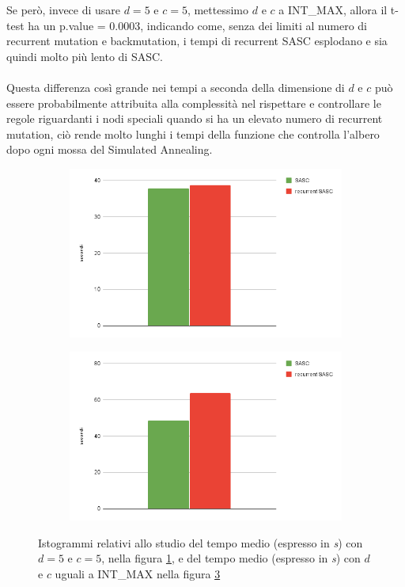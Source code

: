 \documentclass[12pt]{report}
\begin{document}
  Se però, invece di usare $d=5$ e $c=5$, mettessimo $d$ e $c$ a INT\_MAX, allora il t-test ha un p.value = 0.0003, indicando come, senza dei limiti al numero di recurrent mutation e backmutation, i tempi di recurrent SASC esplodano e sia quindi molto più lento di SASC.\\\\
  Questa differenza così grande nei tempi a seconda della dimensione di $d$ e $c$ può essere probabilmente attribuita alla complessità nel rispettare e controllare le regole riguardanti i nodi speciali quando si ha un elevato numero di recurrent mutation, ciò rende molto lunghi i tempi della funzione che controlla l'albero dopo ogni mossa del Simulated Annealing.

  \begin{figure}[H]
    \begin{subfigure}{0.5\textwidth}
      \includegraphics[scale = 0.4]{img/time1.png}
      \caption{}
      \label{img:ista}
    \end{subfigure}
    \begin{subfigure}{0.5\textwidth}
      \includegraphics[scale = 0.4]{img/time2.png}
      \caption{}
      \label{img:istb}
    \end{subfigure}
    \caption{Istogrammi relativi allo studio del tempo medio  (espresso in \emph{s}) con $d=5$ e $c=5$, nella figura \ref{img:ista}, e del tempo medio (espresso in \emph{s}) con $d$ e $c$ uguali a  INT\_MAX nella figura \ref{img:istb}}
  \end{figure}
\end{document}
